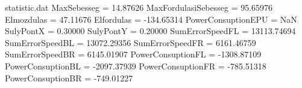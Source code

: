 \begin{filecontents*}{statistic.dat}
MaxSebesseg =   14.87626
MaxFordulasiSebesseg =   95.65976
Elmozdulas =   47.11676
Elfordulas = -134.65314
PowerConsuptionEPU =        NaN
SulyPontX =    0.30000
SulyPontY =    0.20000
SumErrorSpeedFL = 13113.74694
SumErrorSpeedBL = 13072.29356
SumErrorSpeedFR = 6161.46759
SumErrorSpeedBR = 6145.01907
PowerConsuptionFL = -1308.87109
PowerConsuptionBL = -2097.37939
PowerConsuptionFR = -785.51318
PowerConsuptionBR = -749.01227
\end{filecontents*}
